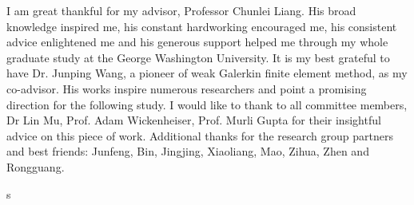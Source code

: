 \begin{acknowledgements}

I am great thankful for my advisor, Professor Chunlei Liang. His broad knowledge inspired me, his constant hardworking  encouraged me, his consistent advice enlightened me and his generous support helped me through my whole graduate study at the George Washington University. It is my best grateful to have Dr. Junping Wang, a pioneer of weak Galerkin finite element method, as my co-advisor. His works inspire numerous researchers and point a promising direction for the following study. I would like to thank to all committee members, Dr Lin Mu, Prof. Adam Wickenheiser, Prof. Murli Gupta for their insightful advice on this piece of work. Additional thanks for the research group partners and best friends: Junfeng, Bin, Jingjing, Xiaoliang, Mao, Zihua, Zhen and Rongguang.

\end{acknowledgements}s
